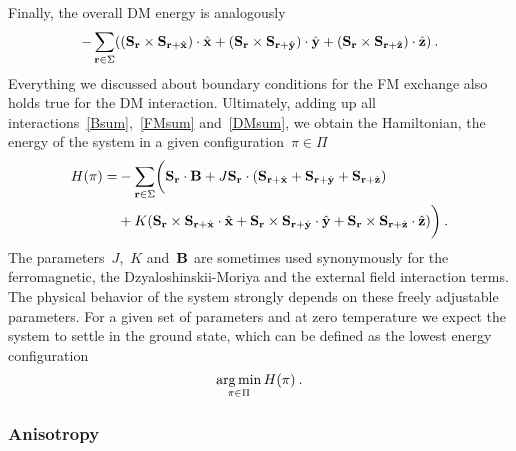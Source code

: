 Finally, the overall DM energy is analogously
%
\begin{equation}\label{DMsum}
  -\sum_{\mathbf{r} \in \Sigma} ((\mathbf{S}_{\mathbf{r}} \times \mathbf{S}_{\mathbf{r} + \hat{\mathbf{x}}}) \cdot \hat{\mathbf{x}} +
    (\mathbf{S}_{\mathbf{r}} \times \mathbf{S}_{\mathbf{r} + \hat{\mathbf{y}}}) \cdot \hat{\mathbf{y}} +
    (\mathbf{S}_{\mathbf{r}} \times \mathbf{S}_{\mathbf{r} + \hat{\mathbf{z}}}) \cdot \hat{\mathbf{z}})\:.
\end{equation}
%
Everything we discussed about boundary conditions for the FM exchange also holds
true for the DM interaction. Ultimately, adding up all
interactions~\eqref{Bsum},~\eqref{FMsum} and~\eqref{DMsum}, we obtain the
Hamiltonian, \ie{} the energy of the system in a given configuration~$\pi \in
\Pi$
%
\begin{align}\label{hamiltonian}
  H(\pi) = &-\sum_{\mathbf{r} \in \Sigma}\biggl(\mathbf{S}_{\mathbf{r}} \cdot \mathbf{B} +
      J \mathbf{S}_{\mathbf{r}} \cdot (\mathbf{S}_{\mathbf{r}+\hat{\mathbf{x}}} + \mathbf{S}_{\mathbf{r}+\hat{\mathbf{y}}} + \mathbf{S}_{\mathbf{r}+\hat{\mathbf{z}}})\nonumber \\
      &+ K (\mathbf{S}_{\mathbf{r}} \times \mathbf{S}_{\mathbf{r}+\hat{\mathbf{x}}} \cdot \hat{\mathbf{x}} +
            \mathbf{S}_{\mathbf{r}} \times \mathbf{S}_{\mathbf{r}+\hat{\mathbf{y}}} \cdot \hat{\mathbf{y}} +
            \mathbf{S}_{\mathbf{r}} \times \mathbf{S}_{\mathbf{r}+\hat{\mathbf{z}}} \cdot \hat{\mathbf{z}})\biggr)\:.
\end{align}
%
The parameters~$J$,~$K$ and~$\mathbf{B}$ are sometimes used synonymously for the
ferromagnetic, the Dzyaloshinskii-Moriya and the external field interaction
terms. The physical behavior of the system strongly depends on these freely
adjustable parameters. For a given set of parameters and at zero temperature we
expect the system to settle in the ground state, which can be defined as the
lowest energy configuration
%
\begin{equation}\label{objective}
  \operatorname*{arg\,min}_{\pi \in \Pi} H(\pi)\:.
\end{equation}
%

\subsubsection{Anisotropy}

